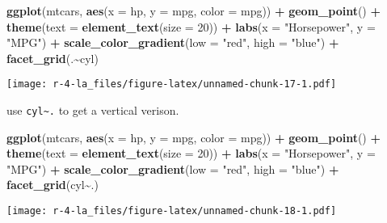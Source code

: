 \documentclass[
]{book}
\newenvironment{Shaded}{\begin{snugshade}}{\end{snugshade}}
\newcommand{\DataTypeTok}[1]{\textcolor[rgb]{0.13,0.29,0.53}{#1}}
\newcommand{\DecValTok}[1]{\textcolor[rgb]{0.00,0.00,0.81}{#1}}
\newcommand{\KeywordTok}[1]{\textcolor[rgb]{0.13,0.29,0.53}{\textbf{#1}}}
\newcommand{\NormalTok}[1]{#1}
\newcommand{\OperatorTok}[1]{\textcolor[rgb]{0.81,0.36,0.00}{\textbf{#1}}}
\newcommand{\StringTok}[1]{\textcolor[rgb]{0.31,0.60,0.02}{#1}}
\begin{document}
\begin{Shaded}
\begin{Highlighting}[]
\KeywordTok{ggplot}\NormalTok{(mtcars, }\KeywordTok{aes}\NormalTok{(}\DataTypeTok{x =}\NormalTok{ hp, }\DataTypeTok{y =}\NormalTok{ mpg, }\DataTypeTok{color =}\NormalTok{ mpg)) }\OperatorTok{+}\StringTok{ }
\StringTok{ }\KeywordTok{geom\_point}\NormalTok{() }\OperatorTok{+}\StringTok{ }
\StringTok{  }\KeywordTok{theme}\NormalTok{(}\DataTypeTok{text =} \KeywordTok{element\_text}\NormalTok{(}\DataTypeTok{size =} \DecValTok{20}\NormalTok{)) }\OperatorTok{+}
\StringTok{  }\KeywordTok{labs}\NormalTok{(}\DataTypeTok{x =} \StringTok{"Horsepower"}\NormalTok{, }\DataTypeTok{y =} \StringTok{"MPG"}\NormalTok{) }\OperatorTok{+}
\StringTok{  }\KeywordTok{scale\_color\_gradient}\NormalTok{(}\DataTypeTok{low =} \StringTok{"red"}\NormalTok{, }\DataTypeTok{high =} \StringTok{"blue"}\NormalTok{) }\OperatorTok{+}
\StringTok{  }\KeywordTok{facet\_grid}\NormalTok{(.}\OperatorTok{\textasciitilde{}}\NormalTok{cyl)}
\end{Highlighting}
\end{Shaded}

\texttt{[image: r-4-la\_files/figure-latex/unnamed-chunk-17-1.pdf]}

use \texttt{cyl\textasciitilde{}.} to get a vertical verison.

\begin{Shaded}
\begin{Highlighting}[]
\KeywordTok{ggplot}\NormalTok{(mtcars, }\KeywordTok{aes}\NormalTok{(}\DataTypeTok{x =}\NormalTok{ hp, }\DataTypeTok{y =}\NormalTok{ mpg, }\DataTypeTok{color =}\NormalTok{ mpg)) }\OperatorTok{+}\StringTok{ }
\StringTok{ }\KeywordTok{geom\_point}\NormalTok{() }\OperatorTok{+}\StringTok{ }
\StringTok{  }\KeywordTok{theme}\NormalTok{(}\DataTypeTok{text =} \KeywordTok{element\_text}\NormalTok{(}\DataTypeTok{size =} \DecValTok{20}\NormalTok{)) }\OperatorTok{+}
\StringTok{  }\KeywordTok{labs}\NormalTok{(}\DataTypeTok{x =} \StringTok{"Horsepower"}\NormalTok{, }\DataTypeTok{y =} \StringTok{"MPG"}\NormalTok{) }\OperatorTok{+}
\StringTok{  }\KeywordTok{scale\_color\_gradient}\NormalTok{(}\DataTypeTok{low =} \StringTok{"red"}\NormalTok{, }\DataTypeTok{high =} \StringTok{"blue"}\NormalTok{) }\OperatorTok{+}
\StringTok{  }\KeywordTok{facet\_grid}\NormalTok{(cyl}\OperatorTok{\textasciitilde{}}\NormalTok{.)}
\end{Highlighting}
\end{Shaded}

\texttt{[image: r-4-la\_files/figure-latex/unnamed-chunk-18-1.pdf]}
\end{document}
